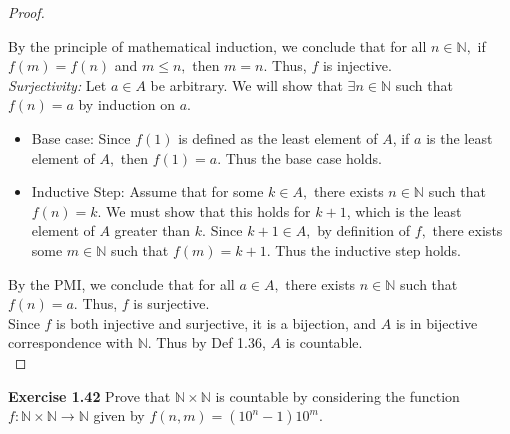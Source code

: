\documentclass[11pt]{article}
\begin{document}
\begin{proof}
\begin{itemize}
\begin{itemize}
        \end{itemize}
    \end{itemize}
    By the principle of mathematical induction, we conclude that for all $n \in \mathbb{N},$ if $f(m) = f(n)$ and $m \leq n,$ then $m = n.$ Thus, $f$ is injective. \\
    \textit{Surjectivity: } Let $a \in A$ be arbitrary. We will show that $\exists n \in \mathbb{N}$ such that $f(n) = a$ by induction on $a$. 
    \begin{itemize}
        \item Base case: Since $f(1)$ is defined as the least element of $A$, if $a$ is the least element of $A,$ then $f(1) = a.$ Thus the base case holds.
        \item Inductive Step: Assume that for some $k \in A,$ there exists $n \in \mathbb{N}$ such that $f(n) = k.$ We must show that this holds for $k + 1$, which is the least element of $A$ greater than $k$. Since $k + 1 \in A,$ by definition of $f,$ there exists some $m \in \mathbb{N}$ such that $f(m) = k + 1.$ Thus the inductive step holds.
    \end{itemize}
    By the PMI, we conclude that for all $a \in A,$ there exists $n \in \mathbb{N}$ such that $f(n) = a.$ Thus, $f$ is surjective. \\
    Since $f$ is both injective and surjective, it is a bijection, and $A$ is in bijective correspondence with $\mathbb{N}.$ Thus by Def 1.36, $A$ is countable. \\
\end{proof}
\noindent\textbf{Exercise 1.42} Prove that $\mathbb{N}\times \mathbb{N}$ is countable by considering the function $f:\mathbb{N}\times\mathbb{N}\longrightarrow \mathbb{N}$ given by $f(n,m)=(10^n-1)10^m$.
\end{document}
